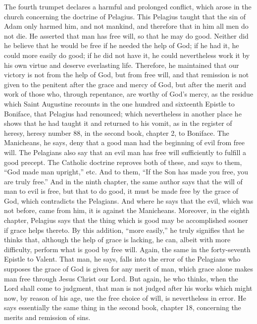 The fourth trumpet declares a harmful and prolonged conflict, which arose in the church concerning the doctrine of Pelagius. This Pelagius taught that the sin of Adam only harmed him, and not mankind, and therefore that in him all men do not die. He asserted that man has free will, so that he may do good. Neither did he believe that he would be free if he needed the help of God; if he had it, he could more easily do good; if he did not have it, he could nevertheless work it by his own virtue and deserve everlasting life. Therefore, he maintained that our victory is not from the help of God, but from free will, and that remission is not given to the penitent after the grace and mercy of God, but after the merit and work of those who, through repentance, are worthy of God’s mercy, as the residue which Saint Augustine recounts in the one hundred and sixteenth Epistle to Boniface, that Pelagius had renounced; which nevertheless in another place he shows that he had taught it and returned to his vomit, as in the register of heresy, heresy number 88, in the second book, chapter 2, to Boniface. The Manicheans, he says, deny that a good man had the beginning of evil from free will. The Pelagians also say that an evil man has free will sufficiently to fulfill a good precept. The Catholic doctrine reproves both of these, and says to them, “God made man upright,” etc. And to them, “If the Son has made you free, you are truly free.” And in the ninth chapter, the same author says that the will of man to evil is free, but that to do good, it must be made free by the grace of God, which contradicts the Pelagians. And where he says that the evil, which was not before, came from him, it is against the Manicheans. Moreover, in the eighth chapter, Pelagius says that the thing which is good may be accomplished sooner if grace helps thereto. By this addition, “more easily,” he truly signifies that he thinks that, although the help of grace is lacking, he can, albeit with more difficulty, perform what is good by free will. Again, the same in the forty-seventh Epistle to Valent. That man, he says, falls into the error of the Pelagians who supposes the grace of God is given for any merit of man, which grace alone makes man free through Jesus Christ our Lord. But again, he who thinks, when the Lord shall come to judgment, that man is not judged after his works which might now, by reason of his age, use the free choice of will, is nevertheless in error. He says essentially the same thing in the second book, chapter 18, concerning the merits and remission of sins.

